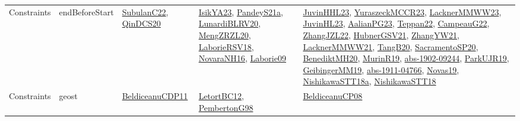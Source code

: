 {\begin{longtable}{lp{3cm}>{\raggedright}p{6cm}>{\raggedright}p{6cm}p{8cm}}
Constraints & endBeforeStart & \href{articles/SubulanC22.pdf}{SubulanC22}\cite{SubulanC22}, \href{articles/QinDCS20.pdf}{QinDCS20}\cite{QinDCS20} & \href{articles/IsikYA23.pdf}{IsikYA23}\cite{IsikYA23}, \href{articles/PandeyS21a.pdf}{PandeyS21a}\cite{PandeyS21a}, \href{articles/LunardiBLRV20.pdf}{LunardiBLRV20}\cite{LunardiBLRV20}, \href{articles/MengZRZL20.pdf}{MengZRZL20}\cite{MengZRZL20}, \href{articles/LaborieRSV18.pdf}{LaborieRSV18}\cite{LaborieRSV18}, \href{articles/NovaraNH16.pdf}{NovaraNH16}\cite{NovaraNH16}, \href{papers/Laborie09.pdf}{Laborie09}\cite{Laborie09} & \href{papers/JuvinHHL23.pdf}{JuvinHHL23}\cite{JuvinHHL23}, \href{articles/YuraszeckMCCR23.pdf}{YuraszeckMCCR23}\cite{YuraszeckMCCR23}, \href{articles/LacknerMMWW23.pdf}{LacknerMMWW23}\cite{LacknerMMWW23}, \href{papers/JuvinHL23.pdf}{JuvinHL23}\cite{JuvinHL23}, \href{papers/AalianPG23.pdf}{AalianPG23}\cite{AalianPG23}, \href{papers/Teppan22.pdf}{Teppan22}\cite{Teppan22}, \href{articles/CampeauG22.pdf}{CampeauG22}\cite{CampeauG22}, \href{papers/ZhangJZL22.pdf}{ZhangJZL22}\cite{ZhangJZL22}, \href{articles/HubnerGSV21.pdf}{HubnerGSV21}\cite{HubnerGSV21}, \href{articles/ZhangYW21.pdf}{ZhangYW21}\cite{ZhangYW21}, \href{papers/LacknerMMWW21.pdf}{LacknerMMWW21}\cite{LacknerMMWW21}, \href{papers/TangB20.pdf}{TangB20}\cite{TangB20}, \href{articles/SacramentoSP20.pdf}{SacramentoSP20}\cite{SacramentoSP20}, \href{articles/BenediktMH20.pdf}{BenediktMH20}\cite{BenediktMH20}, \href{papers/MurinR19.pdf}{MurinR19}\cite{MurinR19}, \href{articles/abs-1902-09244.pdf}{abs-1902-09244}\cite{abs-1902-09244}, \href{papers/ParkUJR19.pdf}{ParkUJR19}\cite{ParkUJR19}, \href{papers/GeibingerMM19.pdf}{GeibingerMM19}\cite{GeibingerMM19}, \href{articles/abs-1911-04766.pdf}{abs-1911-04766}\cite{abs-1911-04766}, \href{articles/Novas19.pdf}{Novas19}\cite{Novas19}, \href{papers/NishikawaSTT18a.pdf}{NishikawaSTT18a}\cite{NishikawaSTT18a}, \href{papers/NishikawaSTT18.pdf}{NishikawaSTT18}\cite{NishikawaSTT18}\\
Constraints & geost & \href{articles/BeldiceanuCDP11.pdf}{BeldiceanuCDP11}\cite{BeldiceanuCDP11} & \href{papers/LetortBC12.pdf}{LetortBC12}\cite{LetortBC12}, \href{papers/PembertonG98.pdf}{PembertonG98}\cite{PembertonG98} & \href{papers/BeldiceanuCP08.pdf}{BeldiceanuCP08}\cite{BeldiceanuCP08}\\

\end{longtable}}
